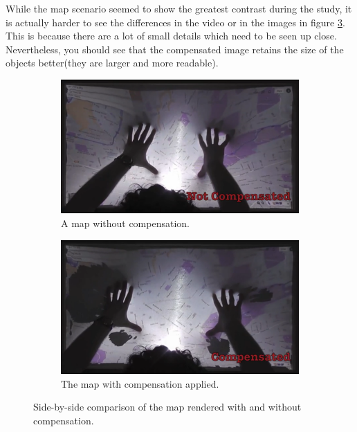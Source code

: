 \documentclass[]{article}
\begin{document}
While the map scenario seemed to show the greatest contrast during the study, it is actually harder to see the differences in the video or in the images in figure \ref{fig:MapComparison}. This is because there are a lot of small details which need to be seen up close. Nevertheless, you should see that the compensated image retains the size of the objects better(they are larger and more readable).

\begin{figure}[!h]
\centering
\begin{subfigure}{.5\textwidth}
  \centering
  \includegraphics[width=0.9\linewidth]{figures/compensation/MapNotCompensated.png}
  \caption{A map without compensation.}
  \label{fig:MapNotCompensated}
\end{subfigure}%
\begin{subfigure}{.5\textwidth}
  \centering
  \includegraphics[width=0.9\linewidth]{figures/compensation/MapCompensated.png}
  \caption{The map with compensation applied.}
  \label{fig:MapCompensated}
\end{subfigure}
\caption{Side-by-side comparison of the map rendered with and without compensation.}
\label{fig:MapComparison}
\end{figure}
\end{document}
